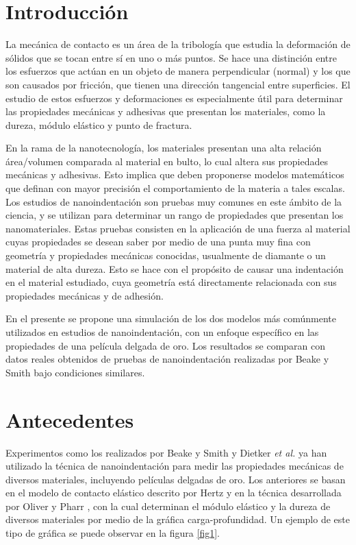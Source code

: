 \documentclass[final,6p,times,twocolumn]{elsarticle}
\begin{document}
\section{Introducci\'on}
La mec\'anica de contacto es un \'area de la tribolog\'ia que estudia la deformaci\'on de s\'olidos que se tocan entre s\'i en uno o más puntos. Se hace una distinci\'on entre los esfuerzos que act\'uan en un objeto de manera perpendicular (normal) y los que son causados por fricci\'on, que tienen una direcci\'on tangencial entre superficies. El estudio de estos esfuerzos y deformaciones es especialmente \'util para determinar las propiedades mec\'anicas y adhesivas que presentan los materiales, como la dureza, m\'odulo el\'astico y punto de fractura.

En la rama de la nanotecnolog\'ia, los materiales presentan una alta relaci\'on \'area/volumen comparada al material en bulto, lo cual altera sus propiedades mec\'anicas y adhesivas. Esto implica que deben proponerse modelos matem\'aticos que definan con mayor precisi\'on el comportamiento de la materia a tales escalas. Los estudios de nanoindentaci\'on son pruebas muy comunes en este \'ambito de la ciencia, y se utilizan para determinar un rango de propiedades que presentan los nanomateriales. Estas pruebas consisten en la aplicaci\'on de una fuerza al material cuyas propiedades se desean saber por medio de una punta muy fina con geometr\'ia y propiedades mec\'anicas conocidas, usualmente de diamante o un material de alta dureza. Esto se hace con el prop\'osito de causar una indentaci\'on en el material estudiado, cuya geometr\'ia est\'a directamente relacionada con sus propiedades mec\'anicas y de adhesi\'on.

En el presente se propone una simulaci\'on de los dos modelos m\'as com\'unmente utilizados en estudios de nanoindentaci\'on, con un enfoque espec\'ifico en las propiedades de una pel\'icula delgada de oro. Los resultados se comparan con datos reales obtenidos de pruebas de nanoindentaci\'on realizadas por Beake y Smith \cite{BEAKE2002} bajo condiciones similares.

\section{Antecedentes}
Experimentos como los realizados por Beake y Smith \cite{BEAKE2002} y Dietker \textit{et al.} \cite{DIETIKER2008} ya han utilizado la t\'ecnica de nanoindentaci\'on para medir las propiedades mec\'anicas de diversos materiales, incluyendo pel\'iculas delgadas de oro. Los anteriores se basan en el modelo de contacto el\'astico descrito por Hertz \cite{HERTZ} y en la t\'ecnica desarrollada por Oliver y Pharr \cite{OLIVER1992}, con la cual determinan el m\'odulo el\'astico y la dureza de diversos materiales por medio de la gr\'afica carga-profundidad. Un ejemplo de este tipo de gr\'afica se puede observar en la figura \ref{fig1}.
\end{document}
